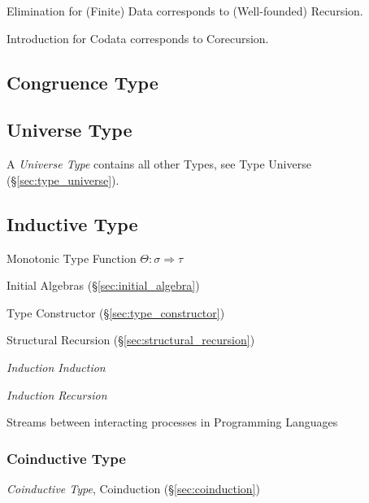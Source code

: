Elimination for (Finite) Data corresponds to (Well-founded)
Recursion.

Introduction for Codata corresponds to Corecursion.



\subsection{Congruence Type}\label{sec:congruence_type}

\subsection{Universe Type}\label{sec:universe_type}

A \emph{Universe Type} contains all other Types, see Type Universe
(\S\ref{sec:type_universe}).



\subsection{Inductive Type}\label{sec:inductive_type}

Monotonic Type Function $\Theta : \sigma \Rightarrow \tau$

Initial Algebras (\S\ref{sec:initial_algebra})

Type Constructor (\S\ref{sec:type_constructor})

Structural Recursion (\S\ref{sec:structural_recursion})

\emph{Induction Induction}

\emph{Induction Recursion}

Streams between interacting processes in Programming Languages



\subsubsection{Coinductive Type}\label{sec:coinductive_type}

\emph{Coinductive Type}, Coinduction (\S\ref{sec:coinduction})



